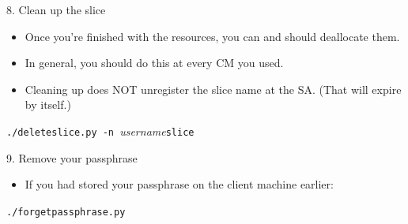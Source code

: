 \documentclass[landscape]{slides}
\newcommand{\heading}[1]{{\fontseries{b}\selectfont\begin{center}{\LARGE\color{red} #1}\end{center}}}
\newcommand{\code}[1]{\begin{center}{\tt #1}\end{center}}
\begin{document}
\begin{slide}
\heading{8. Clean up the slice}
\begin{itemize}
\item Once you're finished with the resources, you can and should deallocate
  them.
\item In general, you should do this at every CM you used.
\item Cleaning up does NOT unregister the slice name at the SA.  (That will
  expire by itself.)
\end{itemize}
\begin{center}{\tt ./deleteslice.py -n }\emph{username}{\tt slice}\end{center}
\end{slide}

\begin{slide}
\heading{9. Remove your passphrase}
\begin{itemize}
\item If you had stored your passphrase on the client machine earlier:
\end{itemize}
\code{./forgetpassphrase.py}
\end{slide}

\end{document}
